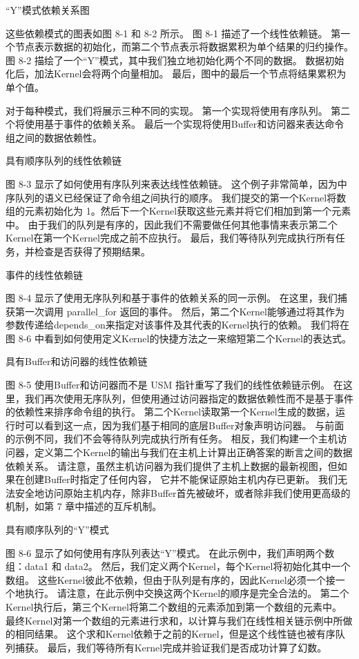 {\color{red} “Y”模式依赖关系图}

这些依赖模式的图表如图 8-1 和 8-2 所示。 图 8-1 描述了一个线性依赖链。 
第一个节点表示数据的初始化，而第二个节点表示将数据累积为单个结果的归约操作。 
图 8-2 描绘了一个“Y”模式，其中我们独立地初始化两个不同的数据。 数据初始化后，加法Kernel会将两个向量相加。 
最后，图中的最后一个节点将结果累积为单个值。

对于每种模式，我们将展示三种不同的实现。 第一个实现将使用有序队列。 第二个将使用基于事件的依赖关系。 
最后一个实现将使用Buffer和访问器来表达命令组之间的数据依赖性。

{\color{red} 具有顺序队列的线性依赖链}

图 8-3 显示了如何使用有序队列来表达线性依赖链。 这个例子非常简单，因为中序队列的语义已经保证了命令组之间执行的顺序。 
我们提交的第一个Kernel将数组的元素初始化为 1。然后下一个Kernel获取这些元素并将它们相加到第一个元素中。 
由于我们的队列是有序的，因此我们不需要做任何其他事情来表示第二个Kernel在第一个Kernel完成之前不应执行。 
最后，我们等待队列完成执行所有任务，并检查是否获得了预期结果。

{\color{red} 事件的线性依赖链}

图 8-4 显示了使用无序队列和基于事件的依赖关系的同一示例。 在这里，我们捕获第一次调用 parallel\_for 返回的事件。 
然后，第二个Kernel能够通过将其作为参数传递给depends\_on来指定对该事件及其代表的Kernel执行的依赖。 
我们将在图 8-6 中看到如何使用定义Kernel的快捷方法之一来缩短第二个Kernel的表达式。

{\color{red} 具有Buffer和访问器的线性依赖链}

图 8-5 使用Buffer和访问器而不是 USM 指针重写了我们的线性依赖链示例。 
在这里，我们再次使用无序队列，但使用通过访问器指定的数据依赖性而不是基于事件的依赖性来排序命令组的执行。 
第二个Kernel读取第一个Kernel生成的数据，运行时可以看到这一点，因为我们基于相同的底层Buffer对象声明访问器。 
与前面的示例不同，我们不会等待队列完成执行所有任务。 
相反，我们构建一个主机访问器，定义第二个Kernel的输出与我们在主机上计算出正确答案的断言之间的数据依赖关系。 
请注意，虽然主机访问器为我们提供了主机上数据的最新视图，但如果在创建Buffer时指定了任何内容，
它并不能保证原始主机内存已更新。 
我们无法安全地访问原始主机内存，除非Buffer首先被破坏，或者除非我们使用更高级的机制，如第 7 章中描述的互斥机制。

{\color{red} 具有顺序队列的“Y”模式}

图 8-6 显示了如何使用有序队列表达“Y”模式。 在此示例中，我们声明两个数组：data1 和 data2。 
然后，我们定义两个Kernel，每个Kernel将初始化其中一个数组。 
这些Kernel彼此不依赖，但由于队列是有序的，因此Kernel必须一个接一个地执行。 
请注意，在此示例中交换这两个Kernel的顺序是完全合法的。 
第二个Kernel执行后，第三个Kernel将第二个数组的元素添加到第一个数组的元素中。 
最终Kernel对第一个数组的元素进行求和，以计算与我们在线性相关链示例中所做的相同结果。 
这个求和Kernel依赖于之前的Kernel，但是这个线性链也被有序队列捕获。 
最后，我们等待所有Kernel完成并验证我们是否成功计算了幻数。


